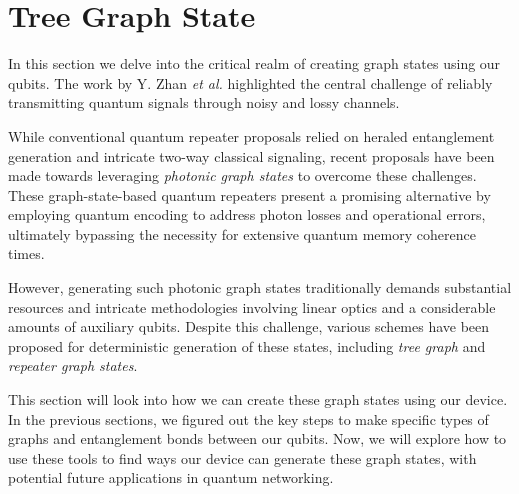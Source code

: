 \section{Tree Graph State}
\label{chap:tree_graph_state}
\thispagestyle{fancy}

In this section we delve into the critical realm of creating graph states using our qubits.
The work by Y. Zhan \emph{et al.} \cite{tree_graph_state} highlighted the central challenge of reliably transmitting quantum signals through noisy and lossy channels.

While conventional quantum repeater proposals relied on heraled entanglement generation and intricate two-way classical signaling, recent proposals have been made towards leveraging \emph{photonic graph states} to overcome these challenges.
These graph-state-based quantum repeaters \cite{One_way_quantum_repeaters} present a promising alternative by employing quantum encoding to address photon losses and operational errors, ultimately bypassing the necessity for extensive quantum memory coherence times.

However, generating such photonic graph states traditionally demands substantial resources and intricate methodologies involving linear optics and a considerable amounts of auxiliary qubits.
Despite this challenge, various schemes have been proposed for deterministic generation of these states, including \emph{tree graph} and \emph{repeater graph states}.

This section will look into how we can create these graph states using our device. 
In the previous sections, we figured out the key steps to make specific types of graphs and entanglement bonds between our qubits.
Now, we will explore how to use these tools to find ways our device can generate these graph states, with potential future applications in quantum networking.



